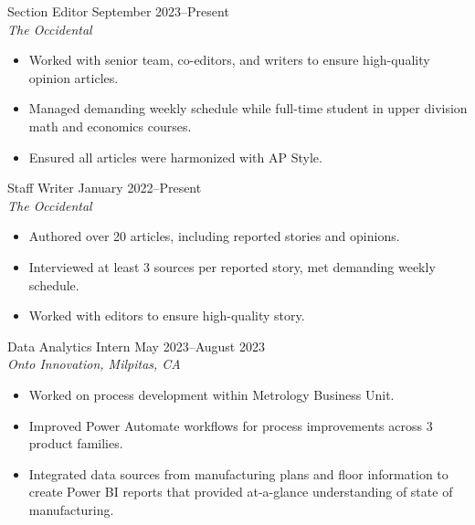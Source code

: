 \documentclass[margin, 12pt]{res} %
\begin{document}
\begin{resume}

Section Editor \hfill September 2023--Present \\
\textit{The Occidental}
\begin{itemize}\itemsep -2pt
  \item Worked with senior team, co-editors, and writers to ensure high-quality opinion articles.
  \item Managed demanding weekly schedule while full-time student in upper division math and economics courses.
  \item Ensured all articles were harmonized with AP Style.
\end{itemize}

Staff Writer \hfill January 2022--Present \\
\textit{The Occidental} 
\begin{itemize} \itemsep -2pt
  \item Authored over 20 articles, including reported stories and opinions.
  \item Interviewed at least 3 sources per reported story, met demanding weekly schedule.
  \item Worked with editors to ensure high-quality story.
\end{itemize} 

{Data Analytics Intern} \hfill May 2023--August 2023 \\
\textit{Onto Innovation, Milpitas, CA}
\begin{itemize} \itemsep -2pt %
  \item Worked on process development within Metrology Business Unit.
  \item Improved Power Automate workflows for process improvements across 3 product families.
  \item Integrated data sources from manufacturing plans and floor information to create Power BI reports that provided at-a-glance understanding of state of manufacturing.
\end{itemize}
%


\end{resume}
\end{document}
